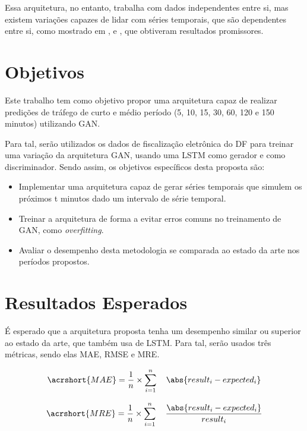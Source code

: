 Essa arquitetura, no entanto, trabalha com dados independentes entre si, mas existem variações capazes de lidar com séries temporais, que são dependentes entre si, como mostrado em \cite{zhou_2018}, \cite{banushev_2019} e \cite{esteban2017real}, que obtiveram resultados promissores.

\section{Objetivos}

Este trabalho tem como objetivo propor uma arquitetura capaz de realizar predições de tráfego de curto e médio período (5, 10, 15, 30, 60, 120 e 150 minutos) utilizando GAN.

Para tal, serão utilizados os dados de fiscalização eletrônica do \acrfull{DF} para treinar uma variação da arquitetura \acrshort{GAN}, usando uma \acrshort{LSTM} como gerador e como discriminador. Sendo assim, os objetivos específicos desta proposta são:

\begin{itemize}
    \item Implementar uma arquitetura capaz de gerar séries temporais que simulem os próximos t minutos dado um intervalo de série temporal.
    \item Treinar a arquitetura de forma a evitar erros comuns no treinamento de \acrshort{GAN}, como \textit{overfitting}.
    \item Avaliar o desempenho desta metodologia se comparada ao estado da arte nos períodos propostos.
\end{itemize}

\section{Resultados Esperados}

É esperado que a arquitetura proposta tenha um desempenho similar ou superior ao estado da arte, que também usa de \acrshort{LSTM}. Para tal, serão usados três métricas, sendo elas \acrfull{MAE}, \acrfull{RMSE} e \acrfull{MRE}. 

\begin{equation}
\acrshort{MAE} = \frac{1}{n} \times \sum_{i=1}^{n} \quad \abs{result_i - expected_i}
\end{equation}

\begin{equation}
\acrshort{MRE} = \frac{1}{n} \times \sum_{i=1}^{n} \quad \frac{\abs{result_i - expected_i}}{result_i}
\end{equation}

